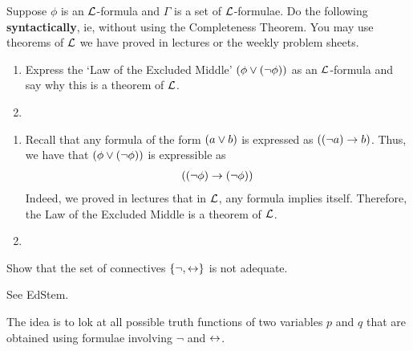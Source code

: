 \begin{boxproblem}
    Suppose $\phi$ is an $\mathcal{L}$-formula and $\Gamma$ is a set of $\mathcal{L}$-formulae. Do the following \textbf{syntactically}, ie, without using the Completeness Theorem. You may use theorems of $\mathcal{L}$ we have proved in lectures or the weekly problem sheets.
    \begin{enumerate}[label = \normalfont (\roman*)]
        \item Express the `Law of the Excluded Middle' $\left( \phi \lor \left( \neg \phi \right) \right)$ as an $\mathcal{L}$-formula and say why this is a theorem of $\mathcal{L}$.
        
        \item \sorry
    \end{enumerate}
\end{boxproblem}
\begin{solution}\hfill
    \begin{enumerate}[label = (\roman*)]
        \item Recall that any formula of the form $\left( a \lor b \right)$ is expressed as $\left( \left( \neg a \right) \to b \right)$. Thus, we have that $\left( \phi \lor \left( \neg \phi \right) \right)$ is expressible as
        \begin{align*}
            \left( \left( \neg {\phi} \right) \to \left( \neg \phi \right) \right)
        \end{align*}
        Indeed, we proved in lectures that in $\mathcal{L}$, any formula implies itself. Therefore, the Law of the Excluded Middle is a theorem of $\mathcal{L}$.

        \item \sorry
    \end{enumerate}    
\end{solution}

\begin{boxproblem}
    Show that the set of connectives $\left\{ \neg, \leftrightarrow \right\}$ is not adequate.
    \begin{hint}
        See EdStem.
    \end{hint}
\end{boxproblem}
\begin{solution}
    The idea is to lok at all possible truth functions of two variables $p$ and $q$ that are obtained using formulae involving $\neg$ and $\leftrightarrow$.
    \sorry
\end{solution}

